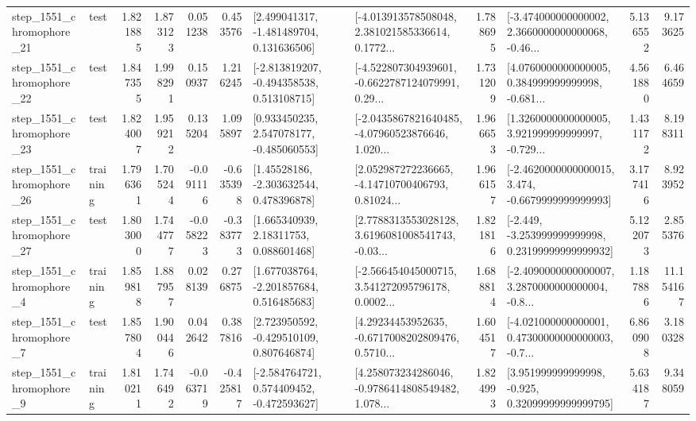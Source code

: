 \begin{tabular}{llrrrrllrlrr}
 step\_1551\_chromophore\_21 &      test &      1.821885 &    1.873123 &      0.051238 &  0.453576 &    [2.499041317, -1.481489704, 0.131636506] &  [-4.013913578508048, 2.381021585336614, 0.1772... &       1.788695 &  [-3.474000000000002, 2.3660000000000068, -0.46... &            5.136552 &          9.173625 \\
 step\_1551\_chromophore\_22 &      test &      1.847355 &    1.998291 &      0.150937 &  1.216245 &   [-2.813819207, -0.494358538, 0.513108715] &  [-4.522807304939601, -0.6622787124079991, 0.29... &       1.731209 &  [4.0760000000000005, 0.384999999999998, -0.681... &            4.561880 &          6.464659 \\
 step\_1551\_chromophore\_23 &      test &      1.824007 &    1.959212 &      0.135204 &  1.095897 &    [0.933450235, 2.547078177, -0.485060553] &  [-2.0435867821640485, -4.07960523876646, 1.020... &       1.966653 &  [1.3260000000000005, 3.921999999999997, -0.729... &            1.431172 &          8.198311 \\
 step\_1551\_chromophore\_26 &  training &      1.796361 &    1.705244 &     -0.091116 & -0.635398 &     [1.45528186, -2.303632544, 0.478396878] &  [2.052987272236665, -4.14710700406793, 0.81024... &       1.966157 &  [-2.4620000000000015, 3.474, -0.6679999999999993] &            3.177416 &          8.923952 \\
 step\_1551\_chromophore\_27 &      test &      1.803000 &    1.744777 &     -0.058223 & -0.383773 &      [1.665340939, 2.18311753, 0.088601468] &  [2.7788313553028128, 3.6196081008541743, -0.03... &       1.821816 &  [-2.449, -3.253999999999998, 0.23199999999999932] &            5.122073 &          2.855376 \\
  step\_1551\_chromophore\_4 &  training &      1.859818 &    1.887957 &      0.028139 &  0.276875 &    [1.677038764, -2.201857684, 0.516485683] &  [-2.566454045000715, 3.541272095796178, 0.0002... &       1.688814 &  [-2.4090000000000007, 3.2870000000000004, -0.8... &            1.187886 &         11.154167 \\
  step\_1551\_chromophore\_7 &      test &      1.857804 &    1.900446 &      0.042642 &  0.387816 &    [2.723950592, -0.429510109, 0.807646874] &  [4.29234453952635, -0.6717008202809476, 0.5710... &       1.604517 &  [-4.021000000000001, 0.47300000000000003, -0.7... &            6.860908 &          3.180328 \\
  step\_1551\_chromophore\_9 &  training &      1.810211 &    1.746492 &     -0.063719 & -0.425817 &   [-2.584764721, 0.574409452, -0.472593627] &  [4.258073234286046, -0.9786414808549482, 1.078... &       1.824993 &   [3.951999999999998, -0.925, 0.32099999999999795] &            5.634187 &          9.348059 \\

\end{tabular}
